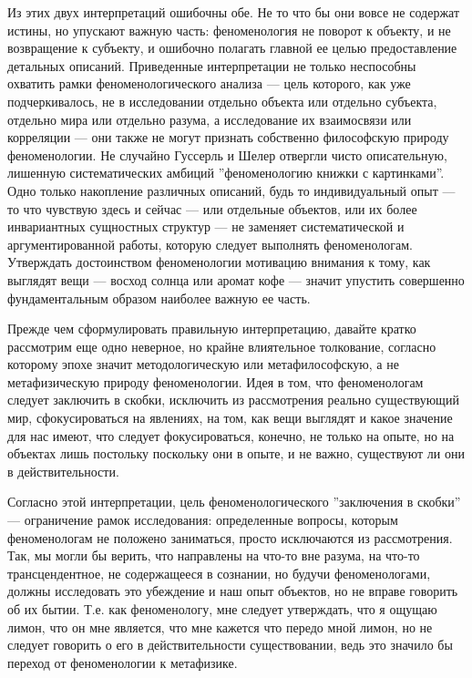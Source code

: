\documentclass[11pt]{book}
\begin{document}
Из этих двух интерпретаций ошибочны обе. Не то что бы они вовсе не содержат истины, но упускают важную часть: феноменология не поворот к объекту, и не возвращение к субъекту, и ошибочно полагать главной ее целью предоставление детальных описаний. Приведенные интерпретации не только неспособны охватить рамки феноменологического анализа --- цель которого, как уже подчеркивалось, не в исследовании отдельно объекта или отдельно субъекта, отдельно мира или отдельно разума, а исследование их взаимосвязи или корреляции --- они также не могут признать собственно философскую природу феноменологии. Не случайно Гуссерль и Шелер отвергли чисто описательную, лишенную систематических амбиций ''феноменологию книжки с картинками''. Одно только накопление различных описаний, будь то индивидуальный опыт --- то что чувствую здесь и сейчас --- или отдельные объектов, или их более инвариантных сущностных структур --- не заменяет систематической и аргументированной работы, которую следует выполнять феноменологам. Утверждать достоинством феноменологии мотивацию внимания к тому, как выглядят вещи --- восход солнца или аромат кофе --- значит упустить совершенно фундаментальным образом наиболее важную ее часть.

Прежде чем сформулировать правильную интерпретацию, давайте кратко рассмотрим еще одно неверное, но крайне влиятельное толкование, согласно которому эпохе значит методологическую или метафилософскую, а не метафизическую природу феноменологии. Идея в том, что феноменологам следует заключить в скобки, исключить из рассмотрения реально существующий мир, сфокусироваться на явлениях, на том, как вещи выглядят и какое значение для нас имеют, что следует фокусироваться, конечно, не только на опыте, но на объектах лишь постольку поскольку они в опыте, и не важно, существуют ли они в действительности.

Согласно этой интерпретации, цель феноменологического ''заключения в скобки'' --- ограничение рамок исследования: определенные вопросы, которым феноменологам не положено заниматься, просто исключаются из рассмотрения. Так, мы могли бы верить, что направлены на что-то вне разума, на что-то трансцендентное, не содержащееся в сознании, но будучи феноменологами, должны исследовать это убеждение и наш опыт объектов, но не вправе говорить об их бытии. Т.е. как феноменологу, мне следует утверждать, что я ощущаю лимон, что он мне является, что мне кажется что передо мной лимон, но не следует говорить о его в действительности существовании, ведь это значило бы переход от феноменологии к метафизике.
\end{document}
